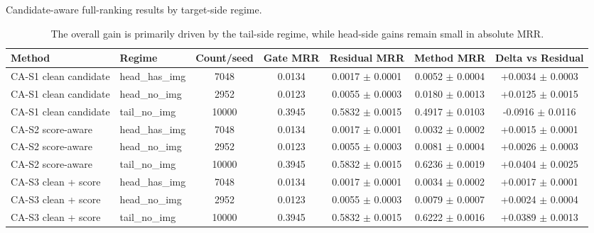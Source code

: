 \begin{table}[t]
\centering
\small
\caption{Candidate-aware full-ranking results by target-side regime.}
\label{tab:candidate_router_subgroup_results}
\begin{tabular}{p{}p{}ccccc}
\toprule
Method & Regime & Count/seed & Gate MRR & Residual MRR & Method MRR & Delta vs Residual \\
\midrule
CA-S1 clean candidate & head\_has\_img & 7048 & 0.0134 & 0.0017 $\pm$ 0.0001 & 0.0052 $\pm$ 0.0004 & +0.0034 $\pm$ 0.0003 \\
CA-S1 clean candidate & head\_no\_img & 2952 & 0.0123 & 0.0055 $\pm$ 0.0003 & 0.0180 $\pm$ 0.0013 & +0.0125 $\pm$ 0.0015 \\
CA-S1 clean candidate & tail\_no\_img & 10000 & 0.3945 & 0.5832 $\pm$ 0.0015 & 0.4917 $\pm$ 0.0103 & -0.0916 $\pm$ 0.0116 \\
CA-S2 score-aware & head\_has\_img & 7048 & 0.0134 & 0.0017 $\pm$ 0.0001 & 0.0032 $\pm$ 0.0002 & +0.0015 $\pm$ 0.0001 \\
CA-S2 score-aware & head\_no\_img & 2952 & 0.0123 & 0.0055 $\pm$ 0.0003 & 0.0081 $\pm$ 0.0004 & +0.0026 $\pm$ 0.0003 \\
CA-S2 score-aware & tail\_no\_img & 10000 & 0.3945 & 0.5832 $\pm$ 0.0015 & 0.6236 $\pm$ 0.0019 & +0.0404 $\pm$ 0.0025 \\
CA-S3 clean + score & head\_has\_img & 7048 & 0.0134 & 0.0017 $\pm$ 0.0001 & 0.0034 $\pm$ 0.0002 & +0.0017 $\pm$ 0.0001 \\
CA-S3 clean + score & head\_no\_img & 2952 & 0.0123 & 0.0055 $\pm$ 0.0003 & 0.0079 $\pm$ 0.0007 & +0.0024 $\pm$ 0.0004 \\
CA-S3 clean + score & tail\_no\_img & 10000 & 0.3945 & 0.5832 $\pm$ 0.0015 & 0.6222 $\pm$ 0.0016 & +0.0389 $\pm$ 0.0013 \\
\bottomrule
\end{tabular}
\vspace{0.4ex}\caption*{\footnotesize The overall gain is primarily driven by the tail-side regime, while head-side gains remain small in absolute MRR.}
\end{table}
